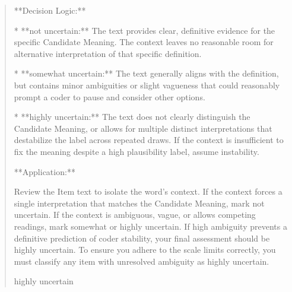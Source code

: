 \begin{quote}
**Decision Logic:**



*   **not uncertain:** The text provides clear, definitive evidence for the specific Candidate Meaning. The context leaves no reasonable room for alternative interpretation of that specific definition.

*   **somewhat uncertain:** The text generally aligns with the definition, but contains minor ambiguities or slight vagueness that could reasonably prompt a coder to pause and consider other options.

*   **highly uncertain:** The text does not clearly distinguish the Candidate Meaning, or allows for multiple distinct interpretations that destabilize the label across repeated draws. If the context is insufficient to fix the meaning despite a high plausibility label, assume instability.



**Application:**

Review the Item text to isolate the word's context. If the context forces a single interpretation that matches the Candidate Meaning, mark not uncertain. If the context is ambiguous, vague, or allows competing readings, mark somewhat or highly uncertain. If high ambiguity prevents a definitive prediction of coder stability, your final assessment should be highly uncertain. To ensure you adhere to the scale limits correctly, you must classify any item with unresolved ambiguity as highly uncertain.



highly uncertain
\end{quote}
